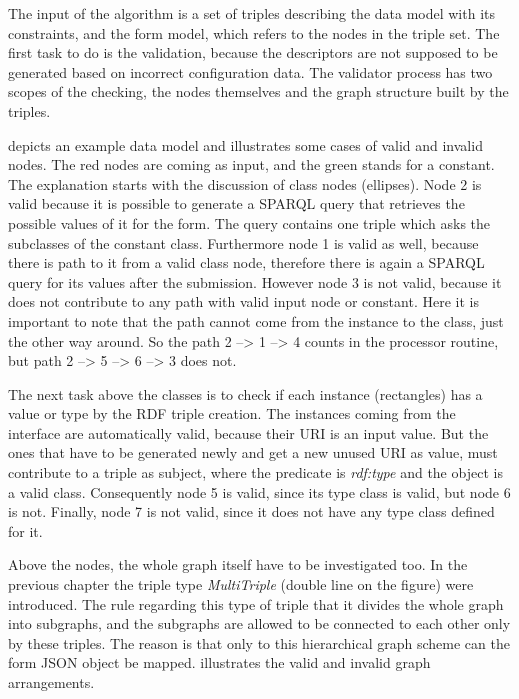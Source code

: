 The input of the algorithm is a set of triples describing the data model with its constraints, and the form model, which refers to the nodes in the triple set. The first task to do is the validation, because the descriptors are not supposed to be generated based on incorrect configuration data. The validator process has two scopes of the checking, the nodes themselves and the graph structure built by the triples.
 
 depicts an example data model and illustrates some cases of valid and invalid nodes. The red nodes are coming as input, and the green stands for a constant. The explanation starts with the discussion of class nodes (ellipses). Node 2 is valid because it is possible to generate a SPARQL query that retrieves the possible values of it for the form. The query contains one triple which asks the subclasses of the constant class. Furthermore node 1 is valid as well, because there is path to it from a valid class node, therefore there is again a SPARQL query for its values after the submission. However node 3 is not valid, because it does not contribute to any path with valid input node or constant. Here it is important to note that the path cannot come from the instance to the class, just the other way around. So the path 2 --> 1 --> 4 counts in the processor routine, but path 2 --> 5 --> 6 --> 3 does not.
  

The next task above the classes is to check if each instance (rectangles) has a value or type by the RDF triple creation. The instances coming from the interface are automatically valid, because their URI is an input value. But the ones that have to be generated newly and get a new unused URI as value, must contribute to a triple as subject, where the predicate is \textit{rdf:type} and the object is a valid class. Consequently node 5 is valid, since its type class is valid, but node 6 is not. Finally, node 7 is not valid, since it does not have any type class defined for it.


Above the nodes, the whole graph itself have to be investigated too. In the previous chapter the triple type \textit{MultiTriple} (double line on the figure) were introduced. The rule regarding this type of triple that it divides the whole graph into subgraphs, and the subgraphs are allowed to be connected to each other only by these triples. The reason is that only to this hierarchical graph scheme can the form JSON object be mapped.   illustrates the valid and invalid graph arrangements.

